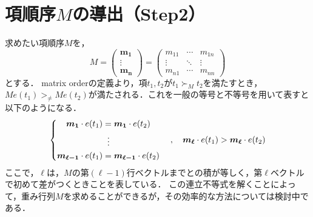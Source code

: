 \section{項順序$M$の導出（Step2）}
求めたい項順序$M$を，
$$
	M = \begin{pmatrix}
		\bm{m_1} \\
		\vdots \\
		\bm{m_n}
	\end{pmatrix}
	=
	\begin{pmatrix}
		m_{11} & \cdots & m_{1n} \\
		\vdots & \ddots & \vdots \\
		m_{n1} & \cdots & m_{nn}
	\end{pmatrix}
$$
とする．
matrix orderの定義より，項$t_1, t_2$が$t_1 \succ_M t_2$を満たすとき，$Me(t_1) >_{\ne} Me(t_2)$が満たされる．これを一般の等号と不等号を用いて表すと以下のようになる．
\begin{equation}
	\left\{
	\begin{aligned}
		\bm{m_1} \cdot e(t_1) &= \bm{m_1} \cdot e(t_2)\\
		&\;\; \vdots \\
		\bm{m_{\ell-1}} \cdot e(t_1) &= \bm{m_{\ell-1}} \cdot e(t_2)
	\end{aligned}
	\right.
	\quad
	,
	\quad \bm{m_{\ell}} \cdot e(t_1)> \bm{m_{\ell}} \cdot e(t_2) \notag
\end{equation}
ここで，$\ell$は，$M$の第$(\ell-1)$行ベクトルまでとの積が等しく，第$\ell$ベクトルで初めて差がつくときことを表している．
この連立不等式を解くことによって，重み行列$M$を求めることができるが，その効率的な方法については検討中である．